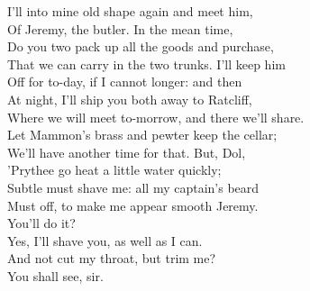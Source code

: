 \documentclass[a4paper,oneside]{memoir}
\begin{document}
\begin{drama*}
I'll into mine old shape again and meet him,\\
Of Jeremy, the butler. In the mean time,\\
Do you two pack up all the goods and purchase,\\
That we can carry in the two trunks. I'll keep him\\
Off for to-day, if I cannot longer: and then\\
At night, I'll ship you both away to Ratcliff,\\
Where we will meet to-morrow, and there we'll share.\\
Let Mammon's brass and pewter keep the cellar;\\
We'll have another time for that. But, Dol,\\
'Prythee go heat a little water quickly;\\
Subtle must shave me: all my captain's beard\\
Must off, to make me appear smooth Jeremy.\\
You'll do it?\\
\subtlespeaks {} Yes, I'll shave you, as well as I can.\\
\facespeaks And not cut my throat, but trim me?\\
\subtlespeaks {} You shall see, sir.\\
\act

\scene


\end{drama*}
\end{document}
